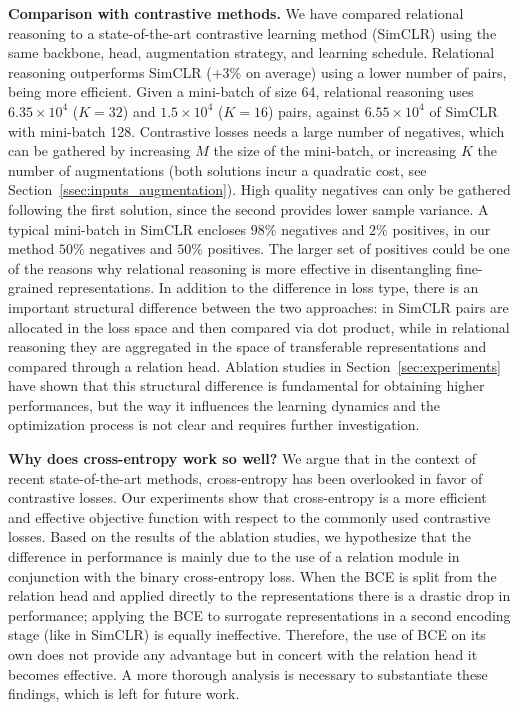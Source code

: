 \documentclass{article}
\begin{document}
\textbf{Comparison with contrastive methods.} We have compared relational reasoning to a state-of-the-art contrastive learning method (SimCLR) using the same backbone, head, augmentation strategy, and learning schedule. Relational reasoning outperforms SimCLR (+3\% on average) using a lower number of pairs, being more efficient. Given a mini-batch of size 64, relational reasoning uses $6.35 \times 10^{4}$ ($K=32$) and $1.5 \times 10^{4}$ ($K=16$) pairs, against $6.55\times10^{4}$ of SimCLR with mini-batch 128.
Contrastive losses needs a large number of negatives, which can be gathered by increasing $M$ the size of the mini-batch, or increasing $K$ the number of augmentations (both solutions incur a quadratic cost, see Section~\ref{ssec:inputs_augmentation}). High quality negatives can only be gathered following the first solution, since the second provides lower sample variance. A typical mini-batch in SimCLR encloses $98\%$ negatives and $2\%$ positives, in our method $50\%$ negatives and $50\%$ positives. The larger set of positives could be one of the reasons why relational reasoning is more effective in disentangling fine-grained representations.
In addition to the difference in loss type, there is an important structural difference between the two approaches: in SimCLR pairs are allocated in the loss space and then compared via dot product, while in relational reasoning they are aggregated in the space of transferable representations and compared through a relation head. Ablation studies in Section~\ref{sec:experiments} have shown that this structural difference is fundamental for obtaining higher performances, but the way it influences the learning dynamics and the optimization process is not clear and requires further investigation.


\textbf{Why does cross-entropy work so well?}
We argue that in the context of recent state-of-the-art methods, cross-entropy has been overlooked in favor of contrastive losses. Our experiments show that cross-entropy is a more efficient and effective objective function with respect to the commonly used contrastive losses. Based on the results of the ablation studies, we hypothesize that the difference in performance is mainly due to the use of a relation module in conjunction with the binary cross-entropy loss. When the BCE is split from the relation head and applied directly to the representations there is a drastic drop in performance; applying the BCE to surrogate representations in a second encoding stage (like in SimCLR) is equally ineffective. Therefore, the use of BCE on its own does not provide any advantage but in concert with the relation head it becomes effective. A more thorough analysis is necessary to substantiate these findings, which is left for future work.
\end{document}
